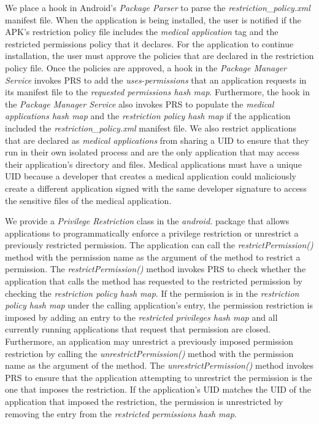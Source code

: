 We place a hook in Android's \textit{Package Parser} to parse the
\textit{restriction\_policy.xml} manifest file. When the application
is being installed, the user is notified if the APK's restriction
policy file includes the \textit{medical application} tag and the
restricted permissions policy 
that it declares. For the application to continue installation, the
user must approve the policies that are declared in the restriction
policy file.  Once the policies are approved, a hook in the
\textit{Package Manager Service} invokes PRS to add
the \textit{uses-permissions} that an application requests 
in its manifest file to the \textit{requested permissions hash map}.
Furthermore, the hook in the \textit{Package Manager Service} also
invokes PRS to populate the \textit{medical applications hash map} and
the \textit{restriction policy hash map} if the application included
the \textit{restriction\_policy.xml} manifest file.  We 
also restrict applications that are declared as
\textit{medical applications} from sharing a UID to ensure
that they run in their own isolated process and are the only application
that may access their application's directory and files.  Medical
applications must have a unique UID because a developer that creates
a medical application could maliciously create a different application
signed with the same developer signature to access the sensitive files
of the medical application.

We provide a \textit{Privilege Restriction} class in the
\textit{android.} package that allows applications to programmatically
enforce a privilege restriction or unrestrict a previously restricted
permission.  The application can call the \textit{restrictPermission()}
method with the permission name as the argument of the method to restrict
a permission.  The \textit{restrictPermission()} method invokes
PRS to check whether the
application that calls the method has requested to the restricted permission
by checking the \textit{restriction policy hash map}.  If the permission
is in the \textit{restriction policy hash map} under the calling application's
entry, the permission restriction is imposed by adding an entry
to the \textit{restricted privileges hash map} and all currently running
applications that request that permission are closed.  Furthermore,
an application may unrestrict a previously imposed permission restriction
by calling the \textit{unrestrictPermission()} method with the permission
name as the argument of the method.  The \textit{unrestrictPermission()}
method invokes PRS to ensure
that the application attempting to unrestrict the permission is the one
that imposes the restriction.  If the application's
UID matches the UID of the application that imposed the restriction,
the permission is unrestricted by removing the entry from the
\textit{restricted permissions hash map}.

